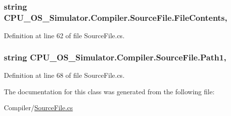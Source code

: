 \subsubsection[{File\+Contents}]{\setlength{\rightskip}{0pt plus 5cm}string C\+P\+U\+\_\+\+O\+S\+\_\+\+Simulator.\+Compiler.\+Source\+File.\+File\+Contents\hspace{0.3cm}{\ttfamily [get]}, {\ttfamily [set]}}\label{class_c_p_u___o_s___simulator_1_1_compiler_1_1_source_file_a6b5d8d9ced4b711efe1a314bc4c1befd}


Definition at line 62 of file Source\+File.\+cs.

\hypertarget{class_c_p_u___o_s___simulator_1_1_compiler_1_1_source_file_a4818dd5ba0ad586dee734231f1c2ebb2}{}
\subsubsection[{Path1}]{\setlength{\rightskip}{0pt plus 5cm}string C\+P\+U\+\_\+\+O\+S\+\_\+\+Simulator.\+Compiler.\+Source\+File.\+Path1\hspace{0.3cm}{\ttfamily [get]}, {\ttfamily [set]}}\label{class_c_p_u___o_s___simulator_1_1_compiler_1_1_source_file_a4818dd5ba0ad586dee734231f1c2ebb2}


Definition at line 68 of file Source\+File.\+cs.



The documentation for this class was generated from the following file\+:\begin{DoxyCompactItemize}
\item 
Compiler/\hyperlink{_source_file_8cs}{Source\+File.\+cs}\end{DoxyCompactItemize}
